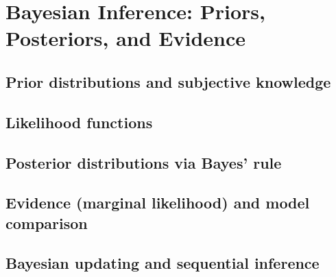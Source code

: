 \section{Bayesian Inference: Priors, Posteriors, and Evidence}
\subsection{Prior distributions and subjective knowledge}
\subsection{Likelihood functions}
\subsection{Posterior distributions via Bayes’ rule}
\subsection{Evidence (marginal likelihood) and model comparison}
\subsection{Bayesian updating and sequential inference}